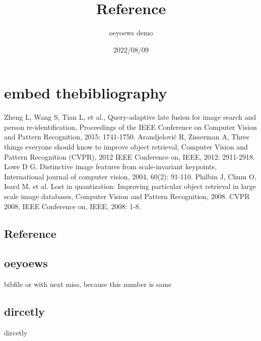 \documentclass{article}
\title{Reference}
\author{oeyoews demo}
\date{2022/08/09}
\begin{document}
\maketitle

\section{embed thebibliography}%
\label{sec:embed thebibliography}

\begin{thebibliography}{99}
Zheng L, Wang S, Tian L, et al., Query-adaptive late fusion for image search and person re-identification, Proceedings of the IEEE Conference on Computer Vision and Pattern Recognition, 2015: 1741-1750.
Arandjelović R, Zisserman A, Three things everyone should know to improve object retrieval, Computer Vision and Pattern Recognition (CVPR), 2012 IEEE Conference on, IEEE, 2012: 2911-2918.
Lowe D G. Distinctive image features from scale-invariant keypoints, International journal of computer vision, 2004, 60(2): 91-110.
Philbin J, Chum O, Isard M, et al. Lost in quantization: Improving particular object retrieval in large scale image databases, Computer Vision and Pattern Recognition, 2008. CVPR 2008, IEEE Conference on, IEEE, 2008: 1-8.
\end{thebibliography}

\subsection{Reference}




\subsection{oeyoews}%

bibfile or with next miss, because this number is same
\cite{oeyoews}

\subsection{dircetly}%
\label{sub:dircetly}

dircetly
\cite{ref1}
\end{document}
